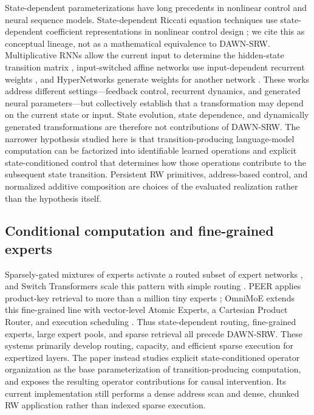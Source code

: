 \documentclass{article}
\newcommand{\DAWN}{DAWN-SRW}
\begin{document}
State-dependent parameterizations have long precedents in nonlinear control
and neural sequence models. State-dependent Riccati equation techniques use
state-dependent coefficient representations in nonlinear control design
\cite{cloutier1997state}; we cite this as conceptual lineage, not as a
mathematical equivalence to \DAWN{}. Multiplicative RNNs allow the current input
to determine the hidden-state transition matrix
\cite{sutskever2011generating}, input-switched affine networks use
input-dependent recurrent weights \cite{foerster2017input}, and HyperNetworks
generate weights for another network \cite{ha2017hypernetworks}. These works
address different settings---feedback control, recurrent dynamics, and generated
neural parameters---but collectively establish that a transformation may depend
on the current state or input. State evolution, state dependence, and
dynamically generated transformations are therefore not contributions of
\DAWN{}. The narrower hypothesis studied here is that transition-producing
language-model computation can be factorized into identifiable learned
operations and explicit state-conditioned control that determines how those
operations contribute to the subsequent state transition.
Persistent RW primitives, address-based control, and normalized additive
composition are choices of the evaluated realization rather than the hypothesis
itself.

\subsection{Conditional computation and fine-grained experts}

Sparsely-gated mixtures of experts activate a routed subset of expert networks
\cite{shazeer2017outrageously}, and Switch Transformers scale this pattern with
simple routing \cite{fedus2022switch}. PEER applies product-key retrieval to
more than a million tiny experts \cite{he2024mixture}; OmniMoE extends this
fine-grained line with vector-level Atomic Experts, a Cartesian Product Router,
and execution scheduling \cite{shi2026omnimoe}. Thus state-dependent routing,
fine-grained experts, large expert pools, and sparse retrieval all precede
\DAWN{}. These systems primarily develop routing, capacity, and efficient sparse
execution for expertized layers. The paper instead studies explicit
state-conditioned operator organization as the base parameterization of
transition-producing computation, and exposes the resulting operator
contributions for causal intervention. Its current implementation still
performs a dense address scan and dense, chunked RW application rather than
indexed sparse execution.
\end{document}
